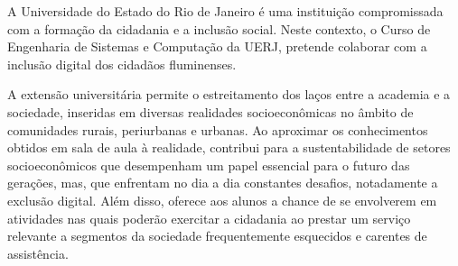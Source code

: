 A Universidade do Estado do Rio de Janeiro é uma instituição compromissada com a formação da cidadania e a inclusão social. Neste contexto, o Curso de Engenharia de Sistemas e Computação da UERJ, pretende colaborar com a inclusão digital dos cidadãos fluminenses.

A extensão universitária permite o estreitamento dos laços entre a academia e a sociedade, inseridas em diversas realidades socioeconômicas no âmbito de comunidades rurais, periurbanas e urbanas. Ao aproximar os conhecimentos obtidos em sala de aula à realidade, contribui para a sustentabilidade de setores socioeconômicos que desempenham um papel essencial para o futuro das gerações, mas, que enfrentam no dia a dia constantes desafios, notadamente a exclusão digital. Além disso, oferece aos alunos a chance de se envolverem em atividades nas quais poderão exercitar a cidadania ao prestar um serviço relevante a segmentos da sociedade frequentemente esquecidos e carentes de assistência.
